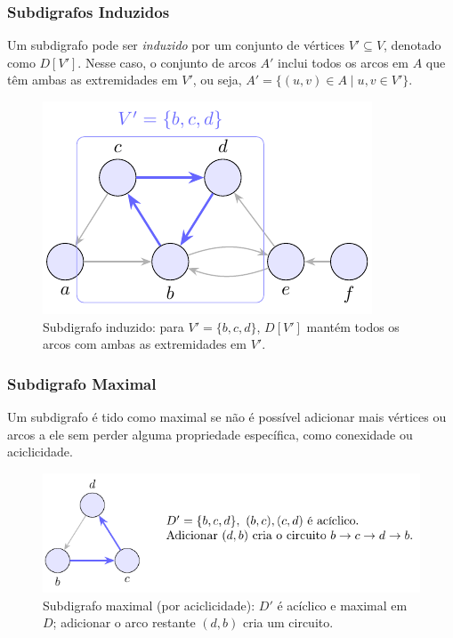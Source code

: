 \subsubsection{Subdigrafos Induzidos}

Um subdigrafo pode ser \emph{induzido} por um conjunto de vértices \(V' \subseteq V\), denotado como \(D[V']\). Nesse caso, o conjunto de arcos \(A'\) inclui todos os arcos em \(A\) que têm ambas as extremidades em \(V'\), ou seja, \(A' = \{(u, v) \in A \mid u, v \in V'\}\).


\begin{figure}[H]
	\centering
	\includegraphics[width=0.9\linewidth]{figures/fig_subdigrafo_induzido.pdf}

	\caption{Subdigrafo induzido: para $V'=\{b,c,d\}$, $D[V']$ mantém todos os arcos com ambas as extremidades em $V'$.}
	\label{fig:subdigrafo-induzido}
\end{figure}


\subsubsection{Subdigrafo Maximal}

Um subdigrafo é tido como maximal se não é possível adicionar mais vértices ou arcos a ele sem perder alguma propriedade específica, como conexidade ou aciclicidade.


\begin{figure}[H]
	\centering
	\includegraphics[width=0.9\linewidth]{figures/fig_subdigrafo_maximal.pdf}

	\caption{Subdigrafo maximal (por aciclicidade): $D'$ é acíclico e maximal em $D$; adicionar o arco restante $(d,b)$ cria um circuito.}
	\label{fig:subdigrafo-maximal}\end{figure}


